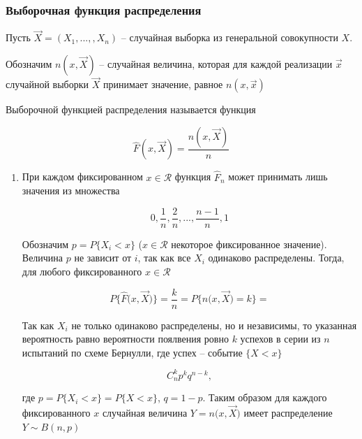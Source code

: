 \subsubsection{Выборочная функция распределения}

Пусть $\vec X = (X_1, ...,, X_n)$ -- случайная выборка из генеральной
совокупности $X$.

Обозначим $n(x, \vec X)$ -- случайная величина, которая для каждой
реализации $\vec x$ случайной выборки $\vec X$ принимает значение,
равное $n(x, \vec x)$

\begin{defenition}
    Выборочной функцией распределения называется функция

    \begin{equation*}
        \hat F (x, \vec X) = \frac{n(x, \vec X)}{n}
    \end{equation*}
\end{defenition}

\begin{note}
    \begin{enumerate}
        \item При каждом фиксированном $x \in \mathcal R$ функция
            $\hat F_n$ может принимать лишь значения из множества

            \begin{equation*}
                0, \frac{1}{n}, \frac{2}{n}, ..., \frac{n-1}{n}, 1
            \end{equation*}

            Обозначим $p = P \{ X_i < x \}$ ($x \in \mathcal R$
            некоторое фиксированное значение). Величина $p$ не зависит
            от $i$, так как все $X_i$ одинаково распределены. Тогда,
            для любого фиксированного $x \in \mathcal R$

            \begin{equation*}
                P \{ \hat F \big( x, \vec X \big)\} = \frac{k}{n} =
                P\{ n \big(x, \vec X \big) = k \} =
            \end{equation*}

            Так как $X_i$ не только одинаково распределены, но и
            независимы, то указанная вероятность равно вероятности
            поялвения ровно $k$ успехов в серии из $n$ испытаний
            по схеме Бернулли, где успех -- событие $\{ X < x\}$

            \begin{equation*}
                C_n^k p^k q^{n-k},
            \end{equation*}

            где $p = P\{X_i < x \} = P\{X < x\}$, $q = 1 - p$. Таким
            образом для каждого фиксированного $x$ случайная величина
            $Y = n \big(x, \vec X\big)$ имеет распределение
            $Y \sim B(n, p)$
    \end{enumerate}
\end{note}


